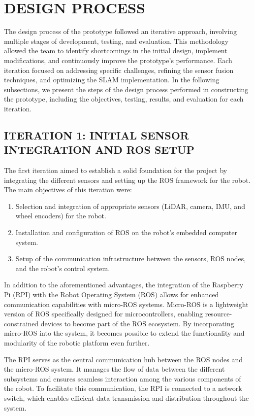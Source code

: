 \documentclass[12pt]{article}
\begin{document}
\section{DESIGN PROCESS}

The design process of the prototype followed an iterative approach, involving multiple stages of development, testing, and evaluation. This methodology allowed the team to identify shortcomings in the initial design, implement modifications, and continuously improve the prototype's performance. Each iteration focused on addressing specific challenges, refining the sensor fusion techniques, and optimizing the SLAM implementation. In the following subsections, we present the steps of the design process performed in constructing the prototype, including the objectives, testing, results, and evaluation for each iteration.

    \subsection{ITERATION 1: INITIAL SENSOR INTEGRATION AND ROS SETUP}
    
    The first iteration aimed to establish a solid foundation for the project by integrating the different sensors and setting up the ROS framework for the robot. The main objectives of this iteration were:

    \begin{enumerate}
        \item Selection and integration of appropriate sensors (LiDAR, camera, IMU, and wheel encoders) for the robot.
        \item Installation and configuration of ROS on the robot's embedded computer system.
        \item Setup of the communication infrastructure between the sensors, ROS nodes, and the robot's control system.
    \end{enumerate}

    In addition to the aforementioned advantages, the integration of the Raspberry Pi (RPI) with the Robot Operating System (ROS) allows for enhanced communication capabilities with micro-ROS systems. Micro-ROS is a lightweight version of ROS specifically designed for microcontrollers, enabling resource-constrained devices to become part of the ROS ecosystem. By incorporating micro-ROS into the system, it becomes possible to extend the functionality and modularity of the robotic platform even further.

    The RPI serves as the central communication hub between the ROS nodes and the micro-ROS system. It manages the flow of data between the different subsystems and ensures seamless interaction among the various components of the robot. To facilitate this communication, the RPI is connected to a network switch, which enables efficient data transmission and distribution throughout the system.
\end{document}
